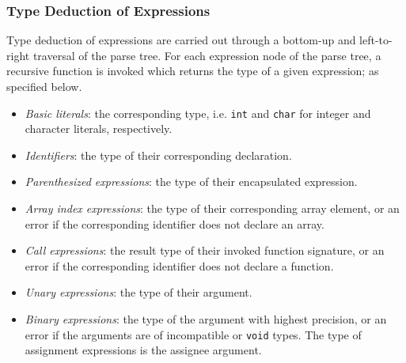 \subsubsection{Type Deduction of Expressions}

Type deduction of expressions are carried out through a bottom-up and left-to-right traversal of the parse tree. For each expression node of the parse tree, a recursive function is invoked which returns the type of a given expression; as specified below.

\begin{itemize}
	\item \textit{Basic literals}: the corresponding type, i.e. \texttt{int} and \texttt{char} for integer and character literals, respectively.
	\item \textit{Identifiers}: the type of their corresponding declaration.
	\item \textit{Parenthesized expressions}: the type of their encapsulated expression.
	\item \textit{Array index expressions}: the type of their corresponding array element, or an error if the corresponding identifier does not declare an array.
	\item \textit{Call expressions}: the result type of their invoked function signature, or an error if the corresponding identifier does not declare a function.
	\item \textit{Unary expressions}: the type of their argument.
	\item \textit{Binary expressions}: the type of the argument with highest precision, or an error if the arguments are of incompatible or \texttt{void} types. The type of assignment expressions is the assignee argument.
\end{itemize}
